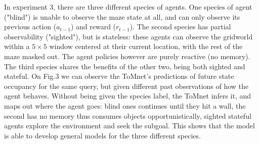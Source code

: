 \documentclass[twocolumn,superscriptaddress,aps]{revtex4-1}
\begin{document}
In experiment 3, there are three different species of agents. One species of agent ("blind") is unable to observe the maze state at all, and can only observe its previous action ($a_{t-1}$) and reward ($r_{t-1}$). The second species has partial observability ("sighted"), but is stateless: these agents can observe the gridworld within a $5 \times 5$ window centered at their current location, with the rest of the maze masked out. The agent policies however are purely reactive (no memory). The third species shares the benefits of the other two, being both sighted and stateful. On Fig.3 we can observe the ToMnet's predictions of future state occupancy for the same query, but given different past observations of how the agent behaves. Without being given the species label, the ToMnet infers it, and maps out where the agent goes:  blind ones continues until they hit a wall, the second has no memory thus consumes objects opportunistically, sighted stateful agents explore the environment and seek the subgoal. This shows that the model is able to develop general models for the three different species.\\
\end{document}
